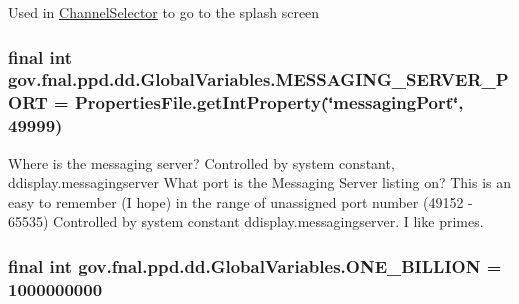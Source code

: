 Used in \hyperlink{classgov_1_1fnal_1_1ppd_1_1dd_1_1ChannelSelector}{Channel\-Selector} to go to the splash screen \hypertarget{classgov_1_1fnal_1_1ppd_1_1dd_1_1GlobalVariables_a3afb8f4fd1dbbc82329ea9ff4aa3629e}{
\subsubsection[{M\-E\-S\-S\-A\-G\-I\-N\-G\-\_\-\-S\-E\-R\-V\-E\-R\-\_\-\-P\-O\-R\-T}]{\setlength{\rightskip}{0pt plus 5cm}final int gov.\-fnal.\-ppd.\-dd.\-Global\-Variables.\-M\-E\-S\-S\-A\-G\-I\-N\-G\-\_\-\-S\-E\-R\-V\-E\-R\-\_\-\-P\-O\-R\-T = {\bf Properties\-File.\-get\-Int\-Property}(\char`\"{}messaging\-Port\char`\"{}, 49999)\hspace{0.3cm}{\ttfamily [static]}}}\label{classgov_1_1fnal_1_1ppd_1_1dd_1_1GlobalVariables_a3afb8f4fd1dbbc82329ea9ff4aa3629e}
Where is the messaging server? Controlled by system constant, ddisplay.\-messagingserver What port is the Messaging Server listing on? This is an easy to remember (I hope) in the range of unassigned port number (49152 -\/ 65535) Controlled by system constant ddisplay.\-messagingserver. I like primes. \hypertarget{classgov_1_1fnal_1_1ppd_1_1dd_1_1GlobalVariables_a271c983add4bac415412025c8ac2f4cc}{
\subsubsection[{O\-N\-E\-\_\-\-B\-I\-L\-L\-I\-O\-N}]{\setlength{\rightskip}{0pt plus 5cm}final int gov.\-fnal.\-ppd.\-dd.\-Global\-Variables.\-O\-N\-E\-\_\-\-B\-I\-L\-L\-I\-O\-N = 1000000000\hspace{0.3cm}{\ttfamily [static]}}}\label{classgov_1_1fnal_1_1ppd_1_1dd_1_1GlobalVariables_a271c983add4bac415412025c8ac2f4cc}
